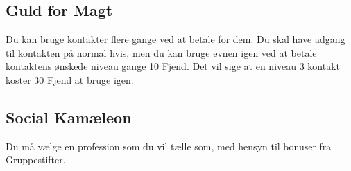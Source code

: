 \subsection*{Guld for Magt}
Du kan bruge kontakter flere gange ved at betale for dem. Du skal have adgang til kontakten på normal hvis, men du kan bruge evnen igen ved at betale kontaktens ønskede niveau gange 10 Fjend. Det vil sige at en niveau 3 kontakt koster 30 Fjend at bruge igen.





\subsection*{Social Kamæleon}
Du må vælge en profession som du vil tælle som, med hensyn til bonuser fra Gruppestifter.  

